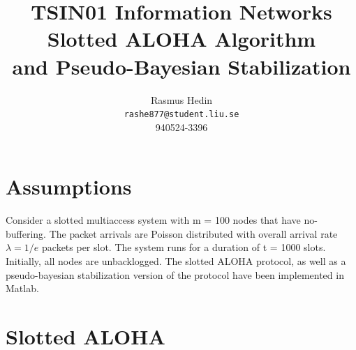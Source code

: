 \documentclass{article}
\begin{document}
\title{%
  TSIN01 Information Networks \\
  \large Slotted ALOHA Algorithm \\
  and Pseudo-Bayesian Stabilization}
\author{Rasmus Hedin \\
  \texttt{rashe877@student.liu.se} \\
940524-3396}

\maketitle

\section{Assumptions}
Consider a slotted multiaccess system with m = 100 nodes that have no-buffering. The packet arrivals are Poisson distributed with overall arrival rate $\lambda = 1/e$ packets per slot. The system runs for a duration of t = 1000 slots. Initially, all nodes are unbacklogged. The slotted ALOHA protocol, as well as a pseudo-bayesian stabilization version of the protocol have been implemented in Matlab.

\section{Slotted ALOHA}
\end{document}
